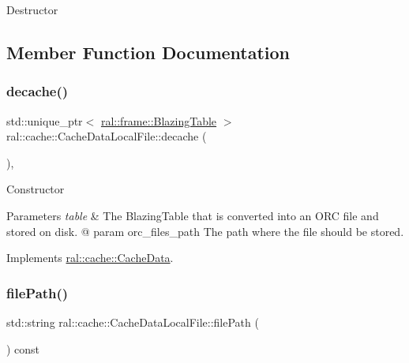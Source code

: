 Destructor 

\subsection{Member Function Documentation}
\mbox{\label{classral_1_1cache_1_1CacheDataLocalFile_a1d34227fbbf671e47119846ee2f2a0af}} 
\subsubsection{\texorpdfstring{decache()}{decache()}}
{\footnotesize\ttfamily std\+::unique\+\_\+ptr$<$ \hyperlink{classral_1_1frame_1_1BlazingTable}{ral\+::frame\+::\+Blazing\+Table} $>$ ral\+::cache\+::\+Cache\+Data\+Local\+File\+::decache (\begin{DoxyParamCaption}{ }\end{DoxyParamCaption})\hspace{0.3cm}{\ttfamily [override]}, {\ttfamily [virtual]}}

Constructor 
\begin{DoxyParams}{Parameters}
{\em table} & The Blazing\+Table that is converted into an O\+RC file and stored on disk. @ param orc\+\_\+files\+\_\+path The path where the file should be stored. \\
\hline
\end{DoxyParams}


Implements \hyperlink{classral_1_1cache_1_1CacheData_a2db8fdd2151babd7a07f4c6e246b710c}{ral\+::cache\+::\+Cache\+Data}.

\mbox{\label{classral_1_1cache_1_1CacheDataLocalFile_a21803499ee4d3ad088c2b5b81b91a042}} 
\subsubsection{\texorpdfstring{file\+Path()}{filePath()}}
{\footnotesize\ttfamily std\+::string ral\+::cache\+::\+Cache\+Data\+Local\+File\+::file\+Path (\begin{DoxyParamCaption}{ }\end{DoxyParamCaption}) const\hspace{0.3cm}{\ttfamily [inline]}}

